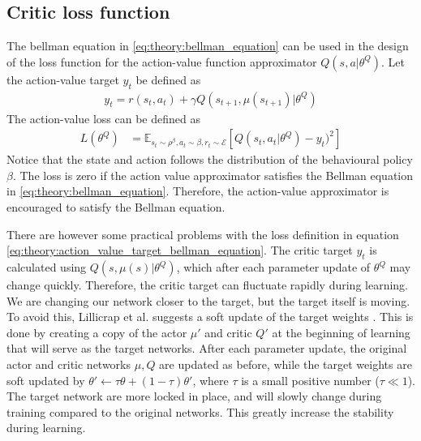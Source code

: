 \documentclass[class=book, crop=false]{standalone}
\begin{document}
\subsection{Critic loss function}
The bellman equation in \eqref{eq:theory:bellman_equation} can be used in the design of the loss function for the action-value function approximator $Q(s,a|\theta^{Q})$. Let the action-value target $y_{t}$ be defined as 
\begin{equation}
   \begin{aligned}\label{eq:theory:action_value_target_bellman_equation}
y_{t} = r(s_{t},a_{t}) + \gamma Q(s_{t+1},\mu(s_{t+1})|\theta^{Q})
\end{aligned} 
\end{equation}
The action-value loss can be defined as 
\begin{equation}
   \begin{aligned}\label{eq:theory:action_value_loss_bellman_equation}
L(\theta^{Q}) 
&= \mathbb{E}_
{s_{t}\sim\rho^{\beta},a_{t} \sim \beta, r_{t} \sim \mathcal{E}}
[Q(s_{t},a_{t}|\theta^{Q})- y_{t})^{2}]
\end{aligned} 
\end{equation}
Notice that the state and action follows the distribution of the behavioural policy $\beta$. The loss is zero if the action value approximator satisfies the Bellman equation in \eqref{eq:theory:bellman_equation}. Therefore, the action-value approximator is encouraged to satisfy the Bellman equation.

There are however some practical problems with the loss definition in equation \eqref{eq:theory:action_value_target_bellman_equation}. The critic target $y_{t}$ is calculated using $Q(s,\mu(s)|\theta^{Q})$, which after each parameter update of $\theta^{Q}$ may change quickly. Therefore, the critic target can fluctuate rapidly during learning. We are changing our network closer to the target, but the target itself is moving. To avoid this, Lillicrap et al. suggests a soft update of the target weights \cite{DBLP:journals/corr/LillicrapHPHETS15}. This is done by creating a copy of the actor $\mu'$ and critic $Q'$ at the beginning of learning that will serve as the target networks. After each parameter update, the original actor and critic networks $\mu,Q$ are updated as before, while the target weights are soft updated by $\theta' \leftarrow \tau\theta + (1-\tau)\theta'$, where $\tau$ is a small positive number ($\tau  \ll 1$). The target network are more locked in place, and will slowly change during training compared to the original networks. This greatly increase the stability during learning. 
\end{document}
